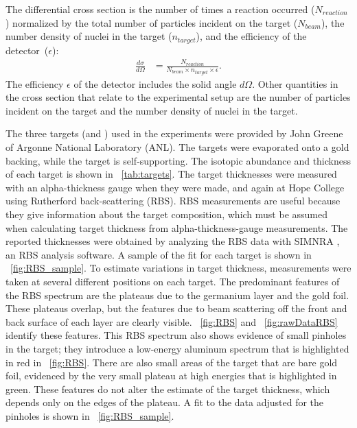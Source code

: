 The differential cross section is the number of times a reaction occurred ($N_{reaction}$) normalized by the total number of particles incident on the target ($N_{beam}$), the number density of nuclei in the target ($n_{target}$), and the {efficiency of the detector}~($\epsilon$):
\begin{align}
\frac{d\sigma}{d\Omega} &= \frac{N_{reaction}}{N_{beam} \times n_{target} \times \epsilon}.
\label{eq:cross_section}
\end{align}
The efficiency $\epsilon$ of the detector includes the solid angle $d\Omega$.  Other quantities in the cross section that relate to the experimental setup are the number of particles incident on the target and the number density of nuclei in the target.

The three targets (\GeTargets and ) used in the experiments were provided by John Greene of Argonne National Laboratory (ANL).  The \GeTargets targets were evaporated onto a gold backing, while the  target is self-supporting.  The isotopic abundance and thickness of each target is shown in {\tab}~\ref{tab:targets}.  The target thicknesses were measured with an alpha-thickness gauge when they were made, and again at Hope College using Rutherford back-scattering (RBS).  RBS measurements are useful because they give information about the target composition, which must be assumed when calculating target thickness from alpha-thickness-gauge measurements.  The reported thicknesses were obtained by analyzing the RBS data with SIMNRA \cite{SIMNRA}, an RBS analysis software.  A sample of the fit for each target is shown in {\fig}~\ref{fig:RBS_sample}.  To estimate variations in target thickness, measurements were taken at several different positions on each target.  The predominant features of the RBS spectrum are the plateaus due to the germanium layer and the gold foil.  These plateaus overlap, but the features due to beam scattering off the front and back surface of each layer are clearly visible.  {\fig}~\ref{fig:RBS} and {\fig}~\ref{fig:rawDataRBS} identify these features.  This RBS spectrum also shows evidence of small pinholes in the target; they introduce a low-energy aluminum spectrum that is highlighted in red in {\fig}~\ref{fig:RBS}.  There are also small areas of the target that are bare gold foil, evidenced by the very small plateau at high energies that is highlighted in green.  These features do not alter the estimate of the target thickness, which depends only on the edges of the plateau.  A fit to the data adjusted for the pinholes is shown in {\fig}~\ref{fig:RBS_sample}. 
